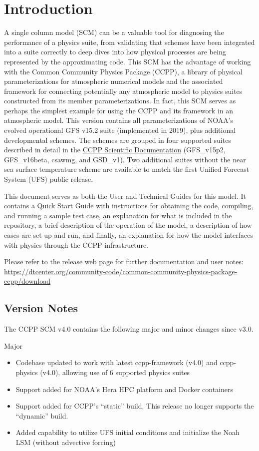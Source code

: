 \chapter{Introduction}
\label{chapter: introduction}

A single column model (SCM) can be a valuable tool for diagnosing the performance of a physics suite, from validating that schemes have been integrated into a suite correctly to deep dives into how physical processes are being represented by the approximating code. This SCM has the advantage of working with the Common Community Physics Package (CCPP), a library of physical parameterizations for atmospheric numerical models and the associated framework for connecting potentially any atmospheric model to physics suites constructed from its member parameterizations. In fact, this SCM serves as perhaps the simplest example for using the CCPP and its framework in an atmospheric model. This version contains all parameterizations of NOAA's evolved operational GFS v15.2 suite (implemented in 2019), plus additional developmental schemes. The schemes are grouped in four supported suites described in detail in the \href{https://dtcenter.org/GMTB/v4.0/sci\_doc/}{CCPP Scientific Documentation} (GFS\_v15p2, GFS\_v16beta, csawmg, and GSD\_v1). Two additional suites without the near sea surface temperature scheme are available to match the first Unified Forecast System (UFS) public release.

This document serves as both the User and Technical Guides for this model. It contains a Quick Start Guide with instructions for obtaining the code, compiling, and running a sample test case, an explanation for what is included in the repository, a brief description of the operation of the model, a description of how cases are set up and run, and finally, an explanation for how the model interfaces with physics through the CCPP infrastructure.

Please refer to the release web page for further documentation and user notes:\\ \url{https://dtcenter.org/community-code/common-community-physics-package-ccpp/download}

\section{Version Notes}

The CCPP SCM v4.0 contains the following major and minor changes since v3.0.

Major
\begin{itemize}
\item Codebase updated to work with latest ccpp-framework (v4.0) and ccpp-physics (v4.0), allowing use of 6 supported physics suites
\item Support added for NOAA's Hera HPC platform and Docker containers
\item Support added for CCPP's ``static'' build. This release no longer supports the ``dynamic'' build.
\item Added capability to utilize UFS initial conditions and initialize the Noah LSM (without advective forcing)
\end{itemize}


